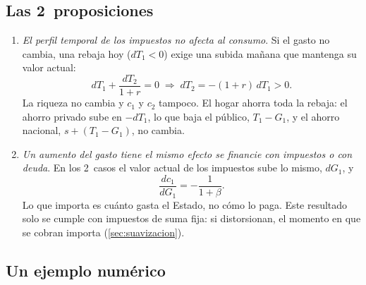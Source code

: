 \documentclass[11pt]{article}
\begin{document}
\subsection{Las 2~proposiciones}

\begin{enumerate}
\item \emph{El perfil temporal de los impuestos no afecta al consumo}. Si el gasto no cambia, una rebaja hoy ($dT_1<0$) exige una subida mañana que mantenga su valor actual:
  \begin{equation*}
  dT_1+\frac{dT_2}{1+r}=0\;\Longrightarrow\;dT_2=-(1+r)\,dT_1>0 .
  \end{equation*}
  La riqueza no cambia y $c_1$ y $c_2$ tampoco. El hogar ahorra toda la rebaja: el ahorro privado sube en $-dT_1$, lo que baja el público, $T_1-G_1$, y el ahorro nacional, $s+(T_1-G_1)$, no cambia.
\item \emph{Un aumento del gasto tiene el mismo efecto se financie con impuestos o con deuda}. En los 2~casos el valor actual de los impuestos sube lo mismo, $dG_1$, y
  \begin{equation*}
  \frac{dc_1}{dG_1}=-\frac{1}{1+\beta}.
  \end{equation*}
  Lo que importa es cuánto gasta el Estado, no cómo lo paga. Este resultado solo se cumple con impuestos de suma fija: si distorsionan, el momento en que se cobran importa (\ref{sec:suavizacion}).
\end{enumerate}

\subsection{Un ejemplo numérico}
\end{document}

